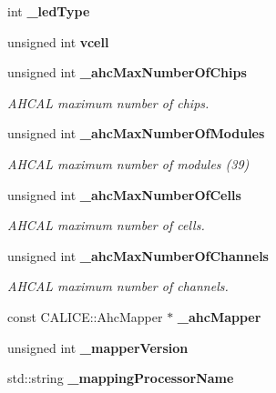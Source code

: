 \begin{DoxyCompactItemize}
\item 
int {\bfseries \-\_\-led\-Type}\label{classExtractSaturationCurveProcessor_a788ccfcf2d60cdd98fa58b8a25960870}

\item 
unsigned int {\bfseries vcell}\label{classExtractSaturationCurveProcessor_a6b92dcd2b25a6e15a9c5e54c964c448a}

\item 
unsigned int {\bf \-\_\-ahc\-Max\-Number\-Of\-Chips}\label{classExtractSaturationCurveProcessor_a6504d810d836fce199cb3a0672c0e7b8}

\begin{DoxyCompactList}\small\item\em A\-H\-C\-A\-L maximum number of chips. \end{DoxyCompactList}\item 
unsigned int {\bf \-\_\-ahc\-Max\-Number\-Of\-Modules}\label{classExtractSaturationCurveProcessor_a27dadca929860032628e9e5984c4635b}

\begin{DoxyCompactList}\small\item\em A\-H\-C\-A\-L maximum number of modules (39) \end{DoxyCompactList}\item 
unsigned int {\bf \-\_\-ahc\-Max\-Number\-Of\-Cells}\label{classExtractSaturationCurveProcessor_a78254103bebe4692ff7113e20be44381}

\begin{DoxyCompactList}\small\item\em A\-H\-C\-A\-L maximum number of cells. \end{DoxyCompactList}\item 
unsigned int {\bf \-\_\-ahc\-Max\-Number\-Of\-Channels}\label{classExtractSaturationCurveProcessor_ab4e53af430d5dd5ccf667a4d3f3c2176}

\begin{DoxyCompactList}\small\item\em A\-H\-C\-A\-L maximum number of channels. \end{DoxyCompactList}\item 
const C\-A\-L\-I\-C\-E\-::\-Ahc\-Mapper $\ast$ {\bfseries \-\_\-ahc\-Mapper}\label{classExtractSaturationCurveProcessor_aad14e61b12d09a38bdbb0128ea8dc2c8}

\item 
unsigned int {\bfseries \-\_\-mapper\-Version}\label{classExtractSaturationCurveProcessor_ae74dd1f33b1ff0ae67e32384bd33d0bf}

\item 
std\-::string {\bfseries \-\_\-mapping\-Processor\-Name}\label{classExtractSaturationCurveProcessor_a46e5e0f8be8ef1842cd478b8be63558c}

\end{DoxyCompactItemize}


